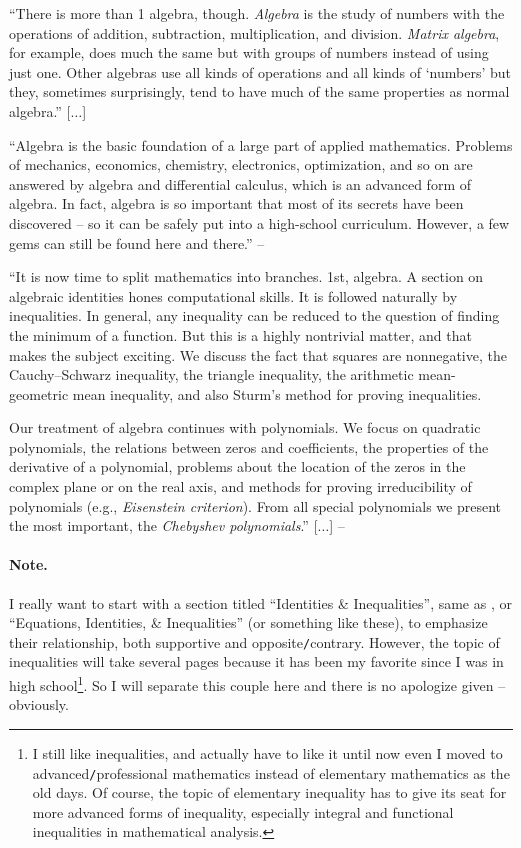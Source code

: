 \documentclass[oneside]{book}
\numberwithin{equation}{section}
\begin{document}
``There is more than 1 algebra, though. \textit{Algebra} is the study of numbers with the operations of addition, subtraction, multiplication, and division. \textit{Matrix algebra}, for example, does much the same but with groups of numbers instead of using just one. Other algebras use all kinds of operations and all kinds of `numbers' but they, sometimes surprisingly, tend to have much of the same properties as normal algebra.'' [$\ldots$]

``Algebra is the basic foundation of a large part of applied mathematics. Problems of mechanics, economics, chemistry, electronics, optimization, and so on are answered by algebra and differential calculus, which is an advanced form of algebra. In fact, algebra is so important that most of its secrets have been discovered -- so it can be safely put into a high-school curriculum. However, a few gems can still be found here and there.'' -- \cite[Chap. 3, p. 35]{Tao2006}

``It is now time to split mathematics into branches. 1st, algebra. A section on algebraic identities hones computational skills. It is followed naturally by inequalities. In general, any inequality can be reduced to the question of finding the minimum of a function. But this is a highly nontrivial matter, and that makes the subject exciting. We discuss the fact that squares are nonnegative, the Cauchy--Schwarz inequality, the triangle inequality, the arithmetic mean-geometric mean inequality, and also Sturm's method for proving inequalities.

Our treatment of algebra continues with polynomials. We focus on quadratic polynomials, the relations between zeros and coefficients, the properties of the derivative of a polynomial, problems about the location of the zeros in the complex plane or on the real axis, and methods for proving irreducibility of polynomials (e.g., \textit{Eisenstein criterion}). From all special polynomials we present the most important, the \textit{Chebyshev polynomials}.'' [$\ldots$] -- \cite[Chap. 2, p. 25]{Gelca_Andreescu2017}

\paragraph{Note.} I really want to start with a section titled ``Identities \& Inequalities'', same as \cite[Sect. 2.1]{Gelca_Andreescu2017}, or ``Equations, Identities, \& Inequalities'' (or something like these), to emphasize their relationship, both supportive and opposite\texttt{/}contrary. However, the topic of inequalities will take several pages because it has been my favorite since I was in high school\footnote{I still like inequalities, and actually have to like it until now even I moved to advanced\texttt{/}professional mathematics instead of elementary mathematics as the old days. Of course, the topic of elementary inequality has to give its seat for more advanced forms of inequality, especially integral and functional inequalities in mathematical analysis.}. So I will separate this couple here and there is no apologize given -- obviously.
\end{document}
